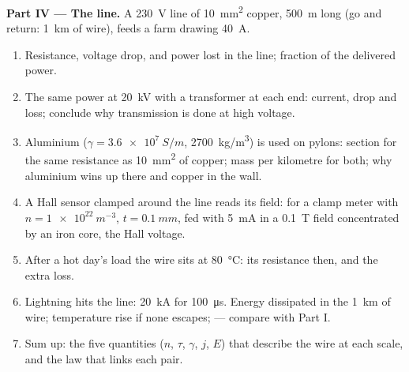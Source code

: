 \begin{problem}
\medskip
\noindent\textbf{Part IV --- The line.}
A \qty{230}{V} line of \qty{10}{mm^2} copper, \qty{500}{m} long (go and return:
\qty{1}{km} of wire), feeds a farm drawing \qty{40}{A}.
\begin{enumerate}[resume]
  \item Resistance, voltage drop, and power lost in the line; fraction
        of the delivered power.
  \item The same power at \qty{20}{kV} with a transformer at each end:
        current, drop and loss; conclude why transmission is done at
        high voltage.
  \item Aluminium ($\gamma = \qty{3.6e7}{S/m}$, \qty{2700}{kg/m^3}) is used on
        pylons: section for the same resistance as \qty{10}{mm^2} of
        copper; mass per kilometre for both; why aluminium wins up
        there and copper in the wall.
  \item A Hall sensor clamped around the line reads its field: for a
        clamp meter with $n = \qty{1e22}{m^{-3}}$, $t = \qty{0.1}{mm}$, fed with
        \qty{5}{mA} in a \qty{0.1}{T} field concentrated by an iron core,
        the Hall voltage.
  \item After a hot day's load the wire sits at \qty{80}{\degreeCelsius}:
        its resistance then, and the extra loss.
  \item Lightning hits the line: \qty{20}{kA} for \qty{100}{\micro s}. Energy
        dissipated in the \qty{1}{km} of wire; temperature rise if none
        escapes;  --- compare with Part I.
  \item Sum up: the five quantities ($n$, $\tau$, $\gamma$, $j$, $E$) that
        describe the wire at each scale, and the law that links each
        pair.
\end{enumerate}
\end{problem}
